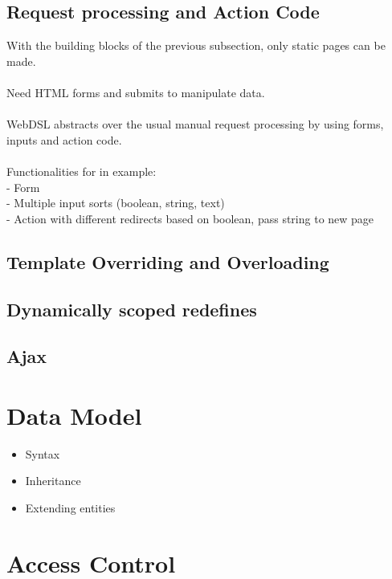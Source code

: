     \subsection{\label{subsec:request-processing}Request processing and Action Code}

      With the building blocks of the previous subsection, only static pages can be made.
      \\\\Need HTML forms and submits to manipulate data.
      \\\\WebDSL abstracts over the usual manual request processing by using forms, inputs and action code.
      \\\\Functionalities for in example:
      \\- Form
      \\- Multiple input sorts (boolean, string, text)
      \\- Action with different redirects based on boolean, pass string to new page

    \subsection{\label{subsec:template-overriding}Template Overriding and Overloading}

    \subsection{\label{subsec:redefines}Dynamically scoped redefines}

    \subsection{\label{subsec:ajax}Ajax}

  \section{\label{sec:data-model}Data Model}

    \begin{itemize}
      \item Syntax
      \item Inheritance
      \item Extending entities
    \end{itemize}

  \section{\label{sec:access-control}Access Control}

